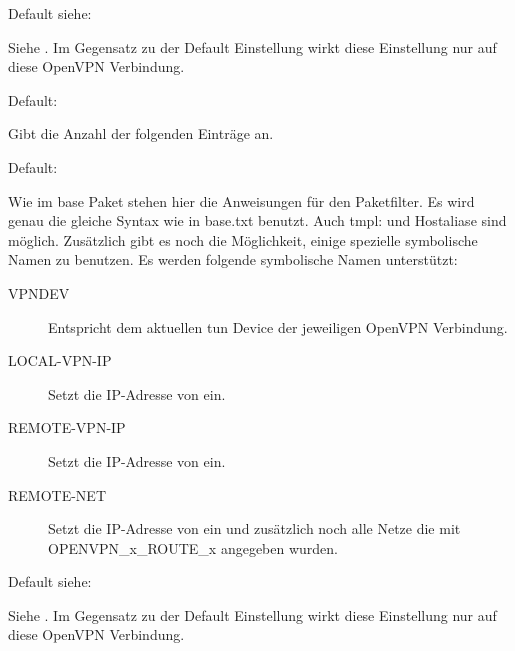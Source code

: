 \begin{description}

  Default siehe: 

  Siehe
  . Im
  Gegensatz zu der Default Einstellung wirkt diese Einstellung nur auf
  diese OpenVPN Verbindung.


  Default: 

  Gibt die Anzahl der folgenden 
  Einträge an.


  Default: 

  Wie im base Paket stehen hier die Anweisungen für den
  Paketfilter. Es wird genau die gleiche Syntax wie in base.txt
  benutzt. Auch tmpl: und Hostaliase sind möglich. Zusätzlich gibt es
  noch die Möglichkeit, einige spezielle symbolische Namen zu
  benutzen. Es werden folgende symbolische Namen unterstützt:

\begin{description}

\item [VPNDEV] Entspricht dem aktuellen tun Device der jeweiligen OpenVPN Verbindung.

\item [LOCAL-VPN-IP] Setzt die IP-Adresse von  ein.

\item [REMOTE-VPN-IP] Setzt die IP-Adresse von  ein.

\item [REMOTE-NET] Setzt die IP-Adresse von  ein und zusätzlich noch alle Netze die mit OPENVPN\_x\_ROUTE\_x angegeben wurden.

\end{description}


  Default siehe: 

  Siehe
  . Im
  Gegensatz zu der Default Einstellung wirkt diese Einstellung nur auf
  diese OpenVPN Verbindung.


\end{description}
